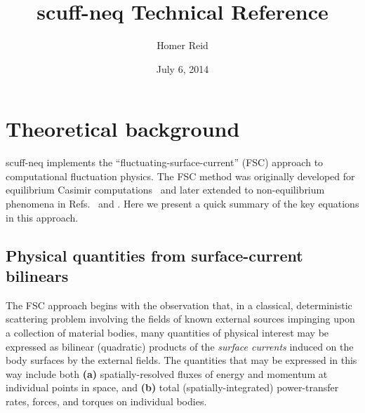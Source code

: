 \documentclass[letterpaper]{article}
\title {{\sc scuff-neq} Technical Reference}
\author {Homer Reid}
\date {July 6, 2014}
\begin{document}
\pagestyle{myheadings}
\maketitle

\tableofcontents

\newpage
\section{Theoretical background}

{\sc scuff-neq} implements the ``fluctuating-surface-current''
(FSC) approach to computational fluctuation physics. The 
FSC method was originally developed for equilibrium Casimir
computations~\cite{Reid2009, Reid2011, Reid2013B} and later
extended to non-equilibrium phenomena in 
Refs.~ and .
Here we present a quick summary of the key equations in this
approach.

\subsection{Physical quantities from surface-current bilinears}
\label{PQsFromSCBsSection}

The FSC approach begins with the observation that, in a 
classical, deterministic scattering problem involving the 
fields of known external sources impinging upon a collection
of material bodies, many quantities of physical interest 
may be expressed as bilinear (quadratic) products of the 
\textit{surface currents} induced on the body surfaces by 
the external fields. The quantities that may be expressed
in this way include both \textbf{(a)} spatially-resolved 
fluxes of energy and momentum at individual points in space,
and \textbf{(b)} total (spatially-integrated) power-transfer 
rates, forces, and torques on individual bodies.
\end{document}
